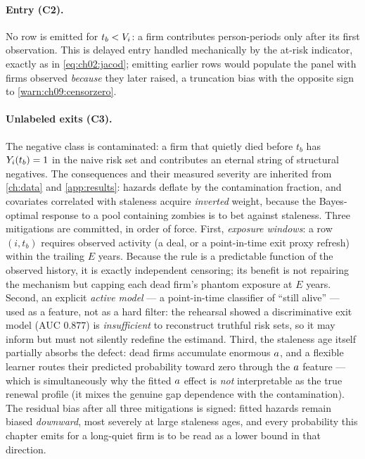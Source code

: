 \paragraph{Entry (C2).} No row is emitted for $t_b < V_i$: a firm
contributes person-periods only after its first observation. This is
delayed entry handled mechanically by the at-risk indicator, exactly as
in \cref{eq:ch02:jacod}; emitting earlier rows would populate the panel
with firms observed \emph{because} they later raised, a truncation bias
with the opposite sign to \cref{warn:ch09:censorzero}.

\paragraph{Unlabeled exits (C3).} The negative class is contaminated:
a firm that quietly died before $t_b$ has $Y_i(t_b) = 1$ in the
naive risk set and contributes an eternal string of structural negatives.
The consequences and their measured severity are inherited from
\cref{ch:data} and \cref{app:results}: hazards deflate by the
contamination fraction, and covariates correlated with staleness acquire
\emph{inverted} weight, because the Bayes-optimal response to a pool
containing zombies is to bet against staleness. Three mitigations are
committed, in order of force. First, \emph{exposure windows}: a row
$(i,t_b)$ requires observed activity (a deal, or a point-in-time exit
proxy refresh) within the trailing $E$ years. Because the rule is a
predictable function of the observed history, it is exactly independent
censoring; its benefit is not repairing the mechanism but capping each
dead firm's phantom exposure at $E$ years. Second, an explicit
\emph{active model} --- a point-in-time classifier of ``still alive'' ---
used as a feature, not as a hard filter: the rehearsal showed a
discriminative exit model (AUC $0.877$) is \emph{insufficient} to
reconstruct truthful risk sets, so it may inform but must not silently
redefine the estimand. Third, the staleness age itself partially absorbs
the defect: dead firms accumulate enormous $a$, and a flexible
learner routes their predicted probability toward zero through the
$a$ feature --- which is simultaneously why the fitted
$a$ effect is \emph{not} interpretable as the true renewal
profile (it mixes the genuine gap dependence with the contamination).
The residual bias after all three mitigations is signed: fitted hazards
remain biased \emph{downward}, most severely at large staleness ages,
and every probability this chapter emits for a long-quiet firm is to be
read as a lower bound in that direction.

